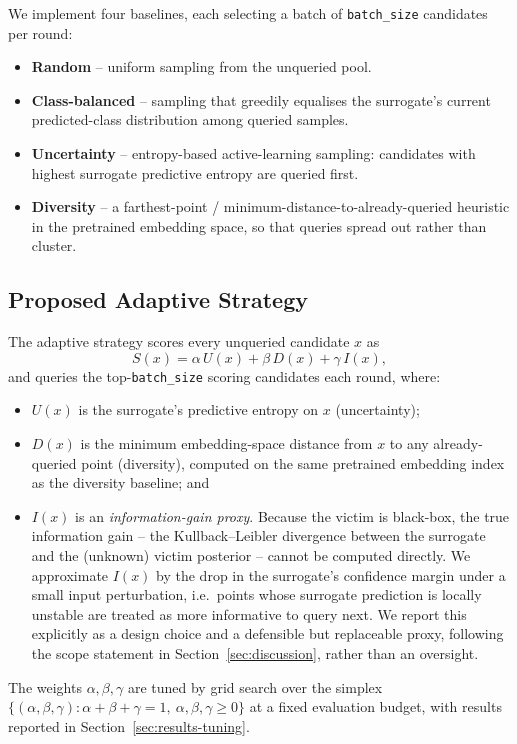 \documentclass[journal,10pt]{IEEEtran}
\begin{document}
We implement four baselines, each selecting a batch of \texttt{batch\_size} candidates per round:
\begin{itemize}
\item \textbf{Random} -- uniform sampling from the unqueried pool.
\item \textbf{Class-balanced} -- sampling that greedily equalises the surrogate's current
predicted-class distribution among queried samples.
\item \textbf{Uncertainty} -- entropy-based active-learning sampling: candidates with highest
surrogate predictive entropy are queried first.
\item \textbf{Diversity} -- a farthest-point / minimum-distance-to-already-queried heuristic in the
pretrained embedding space, so that queries spread out rather than cluster.
\end{itemize}

\subsection{Proposed Adaptive Strategy}
\label{sec:adaptive}

The adaptive strategy scores every unqueried candidate $x$ as
\begin{equation}
S(x) = \alpha\, U(x) + \beta\, D(x) + \gamma\, I(x),
\label{eq:adaptive}
\end{equation}
and queries the top-\texttt{batch\_size} scoring candidates each round, where:
\begin{itemize}
\item $U(x)$ is the surrogate's predictive entropy on $x$ (uncertainty);
\item $D(x)$ is the minimum embedding-space distance from $x$ to any already-queried point
(diversity), computed on the same pretrained embedding index as the diversity baseline; and
\item $I(x)$ is an \emph{information-gain proxy}. Because the victim is black-box, the true
information gain -- the Kullback--Leibler divergence between the surrogate and the (unknown)
victim posterior -- cannot be computed directly. We approximate $I(x)$ by the drop in the
surrogate's confidence margin under a small input perturbation, i.e.\ points whose surrogate
prediction is locally unstable are treated as more informative to query next. We report this
explicitly as a design choice and a defensible but replaceable proxy, following the scope
statement in Section~\ref{sec:discussion}, rather than an oversight.
\end{itemize}
The weights $\alpha,\beta,\gamma$ are tuned by grid search over the simplex
$\{(\alpha,\beta,\gamma): \alpha+\beta+\gamma=1,\ \alpha,\beta,\gamma\ge 0\}$ at a fixed evaluation
budget, with results reported in Section~\ref{sec:results-tuning}.
\end{document}
